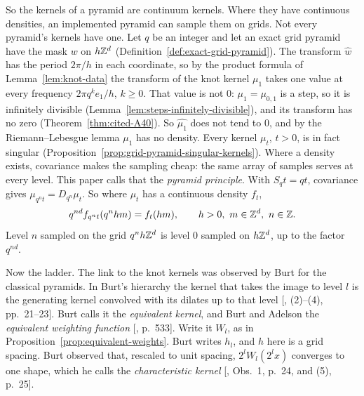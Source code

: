 So the kernels of a pyramid are continuum kernels. Where they have continuous densities, an
implemented pyramid can sample them on grids. Not every pyramid's kernels have one. Let $q$ be an
integer and let an exact grid pyramid have the mask $w$ on $h\mathbb{Z}^d$
(Definition~\ref{def:exact-grid-pyramid}). The transform $\widehat w$ has the period $2\pi/h$ in
each coordinate, so by the product formula of Lemma~\ref{lem:knot-data} the transform of the knot
kernel $\mu_1$ takes one value at every frequency $2\pi q^ke_1/h$, $k \ge 0$. That value is not $0$:
$\mu_1 = \mu_{0,1}$ is a step, so it is infinitely divisible
(Lemma~\ref{lem:steps-infinitely-divisible}), and its transform has no zero
(Theorem~\ref{thm:cited-A40}). So $\widehat{\mu_1}$ does not tend
to $0$, and by the Riemann--Lebesgue lemma $\mu_1$ has no density. Every kernel $\mu_t$, $t > 0$,
is in fact singular (Proposition~\ref{prop:grid-pyramid-singular-kernels}).
Where a density exists, covariance makes the sampling cheap: the same array of samples serves at
every level. This paper calls that the \emph{pyramid principle}. With $S_qt = qt$, covariance gives
$\mu_{q^nt} = D_{q^n}\mu_t$. So where $\mu_t$ has a continuous density $f_t$,
\[
  q^{nd}f_{q^nt}(q^nhm) = f_t(hm), \qquad h > 0,\ m \in \mathbb{Z}^d,\ n \in \mathbb{Z} .
\]
Level $n$ sampled on the grid $q^nh\mathbb{Z}^d$ is level $0$ sampled on $h\mathbb{Z}^d$, up to the factor
$q^{nd}$.

Now the ladder. The link to the knot kernels was observed by Burt for the classical pyramids. In
Burt's hierarchy the kernel that takes the image to level $l$ is the generating kernel convolved
with its dilates up to that level [, (2)--(4), pp.~21--23]. Burt calls it the
\emph{equivalent kernel}, and Burt and Adelson the \emph{equivalent weighting function}
[, p.~533]. Write it $W_l$, as in
Proposition~\ref{prop:equivalent-weights}. Burt writes $h_l$, and $h$ here is a grid spacing.
Burt observed that, rescaled to unit spacing, $2^lW_l(2^lx)$ converges to one shape, which he
calls the \emph{characteristic kernel} [, Obs.~1, p.~24, and (5), p.~25].

